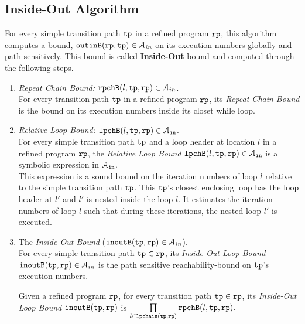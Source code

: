 \subsection{Inside-Out Algorithm}
\label{sec:inoutalg}
For every simple transition path $\mathtt{tp}$ in a refined program $\mathtt{rp}$, 
this algorithm
computes a bound, $\mathtt{outinB}(\mathtt{rp}, \mathtt{tp}) \in \mathcal{A}_{in}$
on its execution numbers globally and path-sensitively.
This bound is called \textbf{Inside-Out} bound and computed
through the following steps.
%
\begin{enumerate}
  \item \emph{Repeat Chain Bound:} $\mathtt{rpchB}(l, \mathtt{tp}, \mathtt{rp}) \in \mathcal{A}_{in}$.
  \\
  For every transition path $\mathtt{tp}$ in a refined program $\mathtt{rp}$,
  its \emph{Repeat Chain Bound} is the
  bound on its execution numbers inside its closet while loop.
  \item \emph{Relative Loop Bound:} $\mathtt{lpchB}(l, \mathtt{tp}, \mathtt{rp}) \in \mathcal{A}_{\mathtt{in}}$.
  \\
  For every simple transition path $\mathtt{tp}$
and a loop header at location $l$ in a refined program $\mathtt{rp}$,
the \emph{Relative Loop Bound} $\mathtt{lpchB}(l, \mathtt{tp}, \mathtt{rp}) \in \mathcal{A}_{\mathtt{in}}$ is a symbolic expression in $\mathcal{A}_{\mathtt{in}}$.
\\
This expression is a sound bound on the iteration numbers of loop $l$ relative to the simple transition path $\mathtt{tp}$.
This $\mathtt{tp}$'s closest enclosing loop has the loop header at $l'$ and $l'$ is nested inside the loop $l$.
It estimates the iteration numbers of loop $l$ such that during these iterations, the nested loop $l'$ is executed.
%
\item The \emph{Inside-Out Bound} ($\mathtt{inoutB}(\mathtt{tp}, \mathtt{rp}) \in \mathcal{A}_{in}$).
\\
For every simple transition path $\mathtt{tp} \in \mathtt{rp}$,
its \emph{Inside-Out Loop Bound}
 $\mathtt{inoutB}(\mathtt{tp}, \mathtt{rp}) \in \mathcal{A}_{in}$ is 
the path sensitive reachability-bound on $\mathtt{tp}$'s execution numbers.

\begin{defn}
  \label{def:outin_bound}
  Given a refined program $\mathtt{rp}$, for every transition path $\mathtt{tp} \in \mathtt{rp}$, 
  its \emph{Inside-Out Loop Bound}
  $\mathtt{inoutB}(\mathtt{tp}, \mathtt{rp})$ is 
$
  \prod\limits_{l \in \mathtt{lpchain}(\mathtt{tp}, \mathtt{rp})} \mathtt{rpchB}(l, \mathtt{tp}, \mathtt{rp}).
$
\end{defn}
\end{enumerate}
